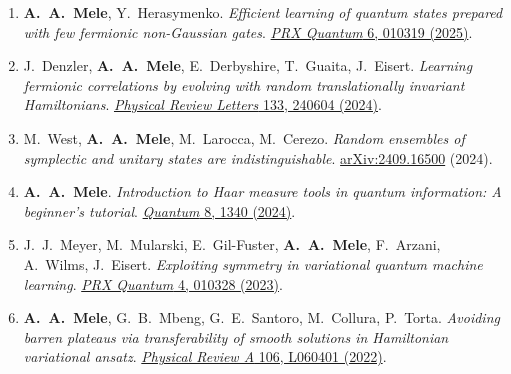 \documentclass[11pt,a4paper]{article}
\newcommand{\cvpubitem}[1]{\item #1}
\begin{document}
\begin{enumerate}
\cvpubitem{\textbf{A.~A.~Mele}, Y.~Herasymenko.
\emph{Efficient learning of quantum states prepared with few fermionic non-Gaussian gates}.
\href{https://doi.org/10.1103/PRXQuantum.6.010319}{\textit{PRX Quantum} 6, 010319 (2025)}.}


\cvpubitem{J.~Denzler, \textbf{A.~A.~Mele}, E.~Derbyshire, T.~Guaita, J.~Eisert.
\emph{Learning fermionic correlations by evolving with random translationally invariant Hamiltonians}.
\href{https://doi.org/10.1103/PhysRevLett.133.240604}{\textit{Physical Review Letters} 133, 240604 (2024)}.}

\cvpubitem{M.~West, \textbf{A.~A.~Mele}, M.~Larocca, M.~Cerezo.
\emph{Random ensembles of symplectic and unitary states are indistinguishable}.
\href{https://arxiv.org/abs/2409.16500}{arXiv:2409.16500} (2024).}

\cvpubitem{\textbf{A.~A.~Mele}.
\emph{Introduction to Haar measure tools in quantum information: A beginner's tutorial}.
\href{https://quantum-journal.org/papers/q-2024-05-08-1340/}{\textit{Quantum} 8, 1340 (2024)}.}


\cvpubitem{J.~J.~Meyer, M.~Mularski, E.~Gil-Fuster, \textbf{A.~A.~Mele}, F.~Arzani, A.~Wilms, J.~Eisert.
\emph{Exploiting symmetry in variational quantum machine learning}.
\href{https://doi.org/10.1103/PRXQuantum.4.010328}{\textit{PRX Quantum} 4, 010328 (2023)}.}


\cvpubitem{\textbf{A.~A.~Mele}, G.~B.~Mbeng, G.~E.~Santoro, M.~Collura, P.~Torta.
\emph{Avoiding barren plateaus via transferability of smooth solutions in Hamiltonian variational ansatz}.
\href{https://doi.org/10.1103/PhysRevA.106.L060401}{\textit{Physical Review A} 106, L060401 (2022)}.}

\end{enumerate}
\end{document}
